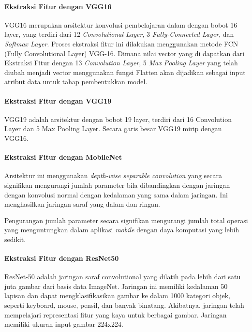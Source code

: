 \paragraph{Ekstraksi Fitur dengan VGG16}
\mbox{}
\par VGG16 merupakan arsitektur konvolusi pembelajaran dalam dengan bobot 16 layer, yang terdiri dari 12 \textit{Convolutional Layer}, 3 \textit{Fully-Connected Layer}, dan \textit{Softmax Layer}. Proses ekstraksi fitur ini dilakukan menggunakan metode FCN (Fully Convolutional Layer) VGG-16. Dimana nilai vector yang di dapatkan dari Ekstraksi Fitur dengan 13 \textit{Convolution Layer}, 5 \textit{Max Pooling Layer} yang telah diubah menjadi vector menggunakan fungsi Flatten akan dijadikan sebagai input atribut data untuk tahap pembentukkan model.

\paragraph{Ekstraksi Fitur dengan VGG19}
\mbox{}
\par VGG19 adalah arsitektur dengan bobot 19 layer, terdiri dari 16 Convolution Layer dan 5 Max Pooling Layer. Secara garis besar VGG19 mirip dengan VGG16. 

\paragraph{Ekstraksi Fitur dengan MobileNet}
\mbox{}
\par Arsitektur ini menggunakan \textit{depth-wise separable convolution} yang secara signifikan mengurangi jumlah parameter bila dibandingkan dengan jaringan dengan konvolusi normal dengan kedalaman yang sama dalam jaringan. Ini menghasilkan jaringan saraf yang dalam dan ringan. 
\par Pengurangan jumlah parameter secara signifikan mengurangi jumlah total operasi yang menguntungkan dalam aplikasi \textit{mobile} dengan daya komputasi yang lebih sedikit.

\paragraph{Ekstraksi Fitur dengan ResNet50}
\mbox{}
\par ResNet-50 adalah jaringan saraf convolutional yang dilatih pada lebih dari satu juta gambar dari basis data ImageNet. Jaringan ini memiliki kedalaman 50 lapisan dan dapat mengklasifikasikan gambar ke dalam 1000 kategori objek, seperti keyboard, mouse, pensil, dan banyak binatang. Akibatnya, jaringan telah mempelajari representasi fitur yang kaya untuk berbagai gambar. Jaringan memiliki ukuran input gambar 224x224.

